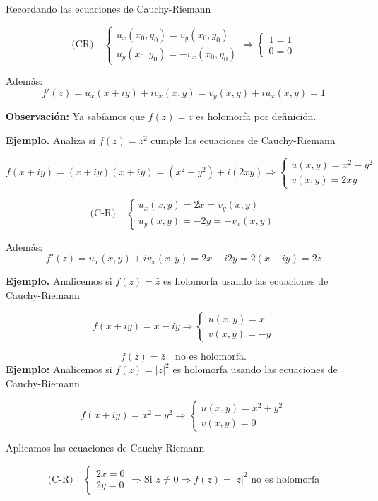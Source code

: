 \documentclass[a4paper,12pt]{article}
\begin{document}
Recordando las ecuaciones de Cauchy-Riemann

\[
\text{(CR)} \quad
\begin{cases}
u_x(x_0, y_0) = v_y(x_0, y_0) \\
u_y(x_0, y_0) = -v_x(x_0, y_0)
\end{cases}
\Rightarrow
\begin{cases}
1 = 1 \\
0 = 0
\end{cases}
\]

Además:
\[
f'(z) = u_x(x + iy) + i v_x(x, y) = v_y(x, y) + i u_x(x, y) = 1
\]

\textbf{Observación:} Ya sabíamos que $f(z) = z$ es holomorfa por definición.

\textbf{Ejemplo.} Analiza si $f(z) = z^2$ cumple las ecuaciones de Cauchy-Riemann

\[
f(x + iy) = (x + iy)(x + iy) = (x^2 - y^2) + i (2xy) \Rightarrow
\begin{cases}
u(x, y) = x^2 - y^2 \\
v(x, y) = 2xy
\end{cases}
\]

\[
\text{(C-R)} \quad
\begin{cases}
u_x(x, y) = 2x = v_y(x, y) \\
u_y(x, y) = -2y = -v_x(x, y)
\end{cases}
\]

Además:
\[
f'(z) = u_x(x, y) + i v_x(x, y) = 2x + i 2y = 2(x + iy) = 2z
\]

\textbf{Ejemplo.} Analicemos si $f(z) = \bar{z}$ es holomorfa usando las ecuaciones de Cauchy-Riemann

\[
f(x + iy) = x - iy \Rightarrow
\begin{cases}
u(x, y) = x \\
v(x, y) = -y
\end{cases}
\]

\[
f(z) = \bar{z} \quad \text{no es holomorfa.}
\]
\newpage
\textbf{Ejemplo:} Analicemos si $f(z) = |z|^2$ es holomorfa usando las ecuaciones de Cauchy-Riemann

\[
f(x + iy) = x^2 + y^2 \Rightarrow 
\begin{cases}
u(x, y) = x^2 + y^2 \\
v(x, y) = 0
\end{cases}
\]

Aplicamos las ecuaciones de Cauchy-Riemann

\[
\text{(C-R)} \quad 
\begin{cases}
2x = 0 \\
2y = 0
\end{cases}
\Rightarrow \text{Si } z \neq 0 \Rightarrow f(z) = |z|^2 \text{ no es holomorfa}
\]
\end{document}
